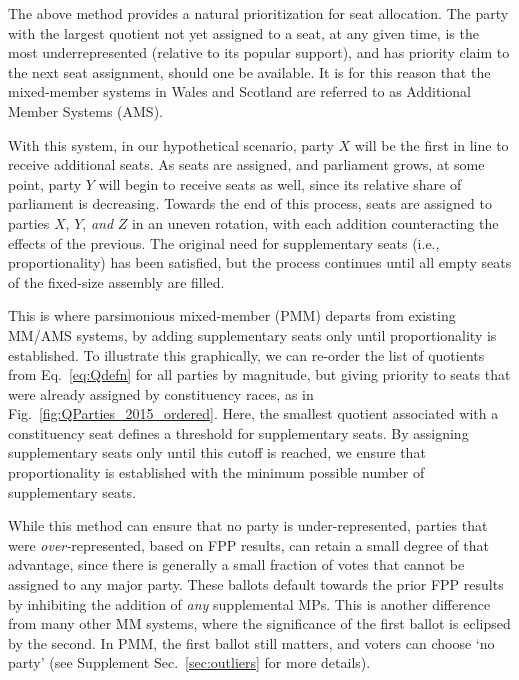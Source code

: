 \documentclass[DIV=calc, paper=a4, fontsize=11pt, twocolumn]{scrartcl}	 %
\begin{document}
The above method provides a natural prioritization for seat allocation. 
The party with the largest quotient not yet assigned to a seat, at any given time, is the most underrepresented (relative to its popular support), and has priority claim to the next seat assignment, should one be available. 
It is for this reason that the mixed-member systems in Wales and Scotland are referred to as Additional Member Systems (AMS).

With this system, in our hypothetical scenario, party $X$ will be the first in line to receive additional seats. As seats are assigned, and parliament grows, at some point, party $Y$ will begin to receive seats as well, since its relative share of parliament is decreasing. 
Towards the end of this process, seats are assigned to parties $X$, $Y$, \emph{and} $Z$ in an uneven rotation, with each addition counteracting the effects of the previous. The original need for supplementary seats (i.e., proportionality) has been satisfied, but the process continues until all empty seats of the fixed-size assembly are filled. 

This is where parsimonious mixed-member (PMM) departs from existing MM/AMS systems, by adding supplementary seats only until proportionality is established. To illustrate this graphically, we can re-order the list of quotients from Eq.~\ref{eq:Qdefn} for all parties by magnitude, but giving priority to seats that were already assigned by constituency races, as in Fig.~\ref{fig:QParties_2015_ordered}. 
Here, the smallest quotient associated with a constituency seat defines a threshold for supplementary seats. By assigning supplementary seats only until this cutoff is reached, we ensure that proportionality is established with the minimum possible number of supplementary seats. 

While this method can ensure that no party is under-represented, parties that were \emph{over-}represented, based on FPP results, can retain a small degree of that advantage, since there is generally a small fraction of votes that cannot be assigned to any major party. These ballots default towards the prior FPP results by inhibiting the addition of \emph{any} supplemental MPs.
This is another difference from many other MM systems, where the significance of the first ballot is eclipsed by the second. In PMM, the first ballot still matters, and voters can choose `no party' (see Supplement Sec.~\ref{sec:outliers} for more details).
\end{document}
